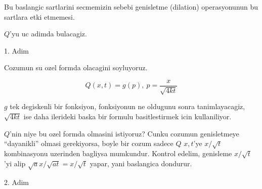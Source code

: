 \documentclass[12pt,fleqn]{article}
\begin{document}
Bu baslangic sartlarini secmemizin sebebi genisletme (dilation)
operasyonunun bu sartlara etki etmemesi. 

$Q$'yu uc adimda bulacagiz. 

1. Adim

Cozumun su ozel formda olacagini soyluyoruz. 

\[ Q(x,t) = g(p), \ p = \frac{x}{\sqrt{4kt}} \]

$g$ tek degiskenli bir fonksiyon, fonksiyonun ne oldugunu sonra
tanimlayacagiz, $\sqrt{4kt}$ ise daha ilerideki baska bir formulu
basitlestirmek icin kullaniliyor. 

$Q$'nin niye bu ozel formda olmasini istiyoruz? Cunku cozumun genisletmeye
``dayanikli'' olmasi gerekiyorsa, boyle bir cozum sadece $Q$ $x,t$'ye
$x/\sqrt{t}$ kombinasyonu uzerinden bagliysa mumkundur. Kontrol edelim,
genisleme $x/\sqrt{t}$'yi alip $\sqrt{a}x/\sqrt{at} = x/\sqrt{t}$ yapar,
yani baslangica dondurur. 

2. Adim
\end{document}

